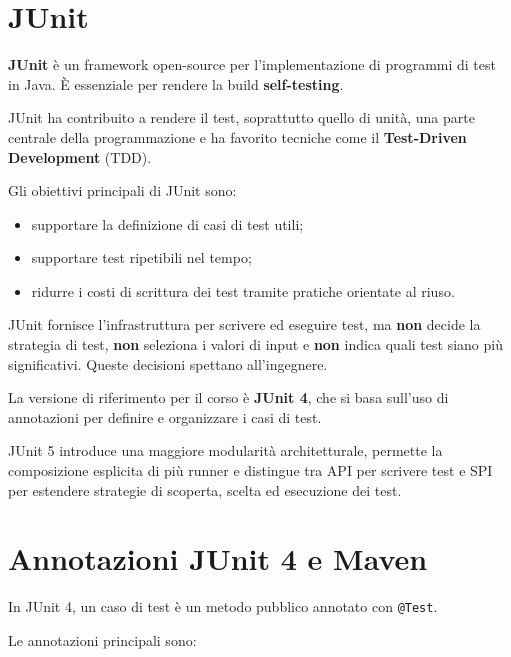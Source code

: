 \section{JUnit}

\textbf{JUnit} è un framework open-source per l'implementazione di programmi di test in Java. È essenziale per rendere la build \textbf{self-testing}.

JUnit ha contribuito a rendere il test, soprattutto quello di unità, una parte centrale della programmazione e ha favorito tecniche come il \textbf{Test-Driven Development} (TDD).

Gli obiettivi principali di JUnit sono:

\begin{itemize}
    \item supportare la definizione di casi di test utili;
    \item supportare test ripetibili nel tempo;
    \item ridurre i costi di scrittura dei test tramite pratiche orientate al riuso.
\end{itemize}

\begin{notaesame}
JUnit fornisce l'infrastruttura per scrivere ed eseguire test, ma \textbf{non} decide la strategia di test, \textbf{non} seleziona i valori di input e \textbf{non} indica quali test siano più significativi. Queste decisioni spettano all'ingegnere.
\end{notaesame}

La versione di riferimento per il corso è \textbf{JUnit 4}, che si basa sull'uso di annotazioni per definire e organizzare i casi di test.

\begin{notaslide}
JUnit 5 introduce una maggiore modularità architetturale, permette la composizione esplicita di più runner e distingue tra API per scrivere test e SPI per estendere strategie di scoperta, scelta ed esecuzione dei test.
\end{notaslide}

\section{Annotazioni JUnit 4 e Maven}

In JUnit 4, un caso di test è un metodo pubblico annotato con \texttt{@Test}.

Le annotazioni principali sono:

